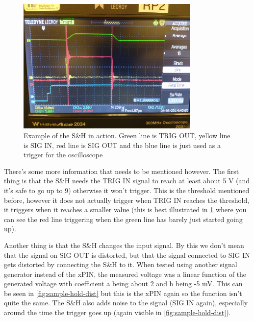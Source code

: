 \documentclass[a4paper, 10pt]{article}
\begin{document}
\begin{figure}[H]
    \centering
    \includegraphics[width=0.8\textwidth]{./images/sample-hold-osci.jpg}
    \caption{Example of the S\&H in action. Green line is TRIG OUT, yellow line is SIG IN, red line is SIG OUT and the blue line is just used as a trigger for the oscilloscope}
    \label{fig:sample-hold-osci}
\end{figure}

There's some more information that needs to be mentioned however.
The first thing is that the S\&H needs the TRIG IN signal to reach at least about 5 \si{\volt} (and it's safe to go up to 9) otherwise it won't trigger.
This is the threshold mentioned before, however it does not actually trigger when TRIG IN reaches the threshold, it triggers when it reaches a smaller value (this is best illustrated in \cref{fig:sample-hold-osci} where you can see the red line triggering when the green line has barely just started going up).

Another thing is that the S\&H changes the input signal.
By this we don't mean that the signal on SIG OUT is distorted, but that the signal connected to SIG IN gets distorted by connecting the S\&H to it.
When tested using another signal generator instead of the xPIN, the measured voltage was a linear function of the generated voltage with coefficient a being about 2 and b being -5 \si{\milli\volt}.
This can be seen in \cref{fig:sample-hold-dist} but this is the xPIN again so the function isn't quite the same.
The S\&H also adds noise to the signal (SIG IN again), especially around the time the trigger goes up (again visible in \cref{fig:sample-hold-dist}).
\end{document}
